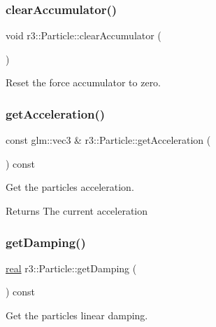 \subsubsection{\texorpdfstring{clear\+Accumulator()}{clearAccumulator()}}
{\footnotesize\ttfamily void r3\+::\+Particle\+::clear\+Accumulator (\begin{DoxyParamCaption}{ }\end{DoxyParamCaption})}



Reset the force accumulator to zero. 

\mbox{\label{classr3_1_1_particle_ab97ffa1b19d4fda5ea49b67531d0300d}} 
\subsubsection{\texorpdfstring{get\+Acceleration()}{getAcceleration()}}
{\footnotesize\ttfamily const glm\+::vec3 \& r3\+::\+Particle\+::get\+Acceleration (\begin{DoxyParamCaption}{ }\end{DoxyParamCaption}) const}



Get the particle\textquotesingle{}s acceleration. 

\begin{DoxyReturn}{Returns}
The current acceleration 
\end{DoxyReturn}
\mbox{\label{classr3_1_1_particle_a5e8544a8ac8e4765a9021f9112209eba}} 
\subsubsection{\texorpdfstring{get\+Damping()}{getDamping()}}
{\footnotesize\ttfamily \mbox{\hyperlink{namespacer3_ab2016b3e3f743fb735afce242f0dc1eb}{real}} r3\+::\+Particle\+::get\+Damping (\begin{DoxyParamCaption}{ }\end{DoxyParamCaption}) const}



Get the particle\textquotesingle{}s linear damping. 

